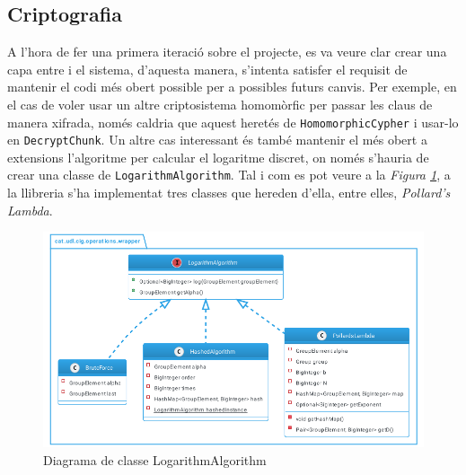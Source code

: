 \subsection{Criptografia}
A l'hora de fer una primera iteració sobre el projecte, es va veure clar crear una capa entre \ciglib i el sistema, d'aquesta manera, s'intenta satisfer el requisit de mantenir el codi més obert possible per a possibles futurs canvis. Per exemple, en el cas de voler usar un altre criptosistema homomòrfic per passar les claus de manera xifrada, només caldria que aquest heretés de \texttt{HomomorphicCypher} i usar-lo en \texttt{DecryptChunk}. Un altre cas interessant és també mantenir el més obert a extensions l'algoritme per calcular el logaritme discret, on només s'hauria de crear una classe de \texttt{LogarithmAlgorithm}. Tal i com es pot veure a la \textit{Figura \ref{fig:logarithm}}, a la llibreria \cite{ciglib} s'ha implementat tres classes que hereden d'ella, entre elles, \textit{Pollard's Lambda}.
\begin{figure}[H]
	\centering
	\includegraphics[width=16cm]{classes/log.png}
	\caption{Diagrama de classe LogarithmAlgorithm}
	\label{fig:logarithm}
\end{figure}
